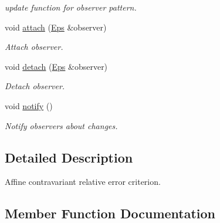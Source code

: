 \begin{DoxyCompactItemize}
\begin{DoxyCompactList}\small\item\em update function for observer pattern. \end{DoxyCompactList}\item 
\hypertarget{classSpacy_1_1Mixin_1_1MixinConnection_abb5520ee6b22dd993d78f142939a1ed4}{}void \hyperlink{classSpacy_1_1Mixin_1_1MixinConnection_abb5520ee6b22dd993d78f142939a1ed4}{attach} (\hyperlink{classSpacy_1_1Mixin_1_1Eps_a51dbe0b9cc950e0f3dfd34a481f08ae4}{Eps} \&observer)\label{classSpacy_1_1Mixin_1_1MixinConnection_abb5520ee6b22dd993d78f142939a1ed4}

\begin{DoxyCompactList}\small\item\em Attach observer. \end{DoxyCompactList}\item 
\hypertarget{classSpacy_1_1Mixin_1_1MixinConnection_adda739590c487679c26f60e50aedb73f}{}void \hyperlink{classSpacy_1_1Mixin_1_1MixinConnection_adda739590c487679c26f60e50aedb73f}{detach} (\hyperlink{classSpacy_1_1Mixin_1_1Eps_a51dbe0b9cc950e0f3dfd34a481f08ae4}{Eps} \&observer)\label{classSpacy_1_1Mixin_1_1MixinConnection_adda739590c487679c26f60e50aedb73f}

\begin{DoxyCompactList}\small\item\em Detach observer. \end{DoxyCompactList}\item 
\hypertarget{classSpacy_1_1Mixin_1_1MixinConnection_a1ddeaa78a3bb4a38c2cca36d1f99fe36}{}void \hyperlink{classSpacy_1_1Mixin_1_1MixinConnection_a1ddeaa78a3bb4a38c2cca36d1f99fe36}{notify} ()\label{classSpacy_1_1Mixin_1_1MixinConnection_a1ddeaa78a3bb4a38c2cca36d1f99fe36}

\begin{DoxyCompactList}\small\item\em Notify observers about changes. \end{DoxyCompactList}\end{DoxyCompactItemize}


\subsection{Detailed Description}
Affine contravariant relative error criterion. 

\subsection{Member Function Documentation}
\hypertarget{classSpacy_1_1Newton_1_1Termination_1_1AffineContravariant_a16b9829fd882e948b5d273b80c549f4b}{}
